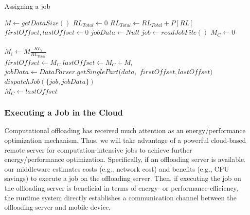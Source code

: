 \documentclass{sig-alternate}
\begin{document}
\begin{algorithm}
\caption{Assigning a job}
\label{alg:assign_job}
\begin{algorithmic}[1]
\begin{scriptsize}
\State $M \leftarrow {getDataSize()}$
\State $RL_{Total} \leftarrow 0$ 
  \State $RL_{Total} \leftarrow RL_{Total} + P[RL]$
\EndFor
\\
\State $firstOffset, lastOffset \leftarrow 0$
\State $jobData \leftarrow Null$
\State $job \leftarrow {readJobFile()}$
\State $M_{C} \leftarrow 0$
\\
\\
  \State $M_{i} \leftarrow M\frac{RL_{i}}{RL_{Total}}$\\
  \State $firstOffset \leftarrow M_{C} $
  \State $lastOffset \leftarrow M_{C} + M_{i}$
  \State $jobData \leftarrow DataParser.getSinglePart(data,$
  \State 
		\hspace{\algorithmicindent}
		\hspace{\algorithmicindent}
		\hspace{\algorithmicindent}
		\hspace{\algorithmicindent}
		\hspace{\algorithmicindent}
						$firstOffset, lastOffset)$
  \State $dispatchJob(\{job, jobData\})$\\
  \State $M_{C} \leftarrow lastOffset$
  
\EndFor

\EndFunction
\end{scriptsize}
\end{algorithmic}
\end{algorithm}

\subsubsection{Executing a Job in the Cloud}
Computational offloading \cite{kwon+:icsm13} has received much attention as an energy/performance optimization mechanism. Thus, we will take advantage of a powerful cloud-based remote server for computation-intensive jobs to achieve further energy/performance optimization. Specifically, if an offloading server is available, our middleware estimates costs (e.g., network cost) and benefits (e.g., CPU savings) to execute a job on the offloading server. Then, if executing the job on the offloading server is beneficial in terms of energy- or performance-efficiency, the runtime system directly establishes a communication channel between the offloading server and mobile device.
\end{document}
